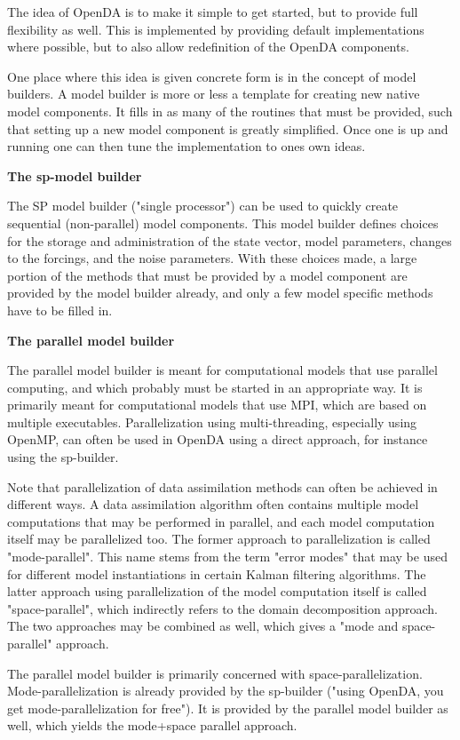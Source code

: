 The idea of OpenDA is to make it simple to get started, but to provide full flexibility as well. This is implemented by providing default implementations where possible, but to also allow redefinition of the OpenDA components.

One place where this idea is given concrete form is in the concept of model builders. A model builder is more or less a template for creating new native model components. It fills in as many of the routines that must be provided, such that setting up a new model component is greatly simplified. Once one is up and running one can then tune the implementation to ones own ideas.

\textbf{The sp-model builder}

The SP model builder ("single processor") can be used to quickly create sequential (non-parallel) model components. This model builder defines choices for the storage and administration of the state vector, model parameters, changes to the forcings, and the noise parameters. With these choices made, a large portion of the methods that must be provided by a model component are provided by the model builder already, and only a few model specific methods have to be filled in.

\textbf{The parallel model builder}

The parallel model builder is meant for computational models that use parallel computing, and which probably must be started in an appropriate way. It is primarily meant for computational models that use MPI, which are based on multiple executables. Parallelization using multi-threading, especially using OpenMP, can often be used in OpenDA using a direct approach, for instance using the sp-builder.

Note that parallelization of data assimilation methods can often be achieved in different ways. A data assimilation algorithm often contains multiple model computations that may be performed in parallel, and each model computation itself may be parallelized too. The former approach to parallelization is called "mode-parallel". This name stems from the term "error modes" that may be used for different model instantiations in certain Kalman filtering algorithms. The latter approach using parallelization of the model computation itself is called "space-parallel", which indirectly refers to the domain decomposition approach. The two approaches may be combined as well, which gives a "mode and space-parallel" approach.

The parallel model builder is primarily concerned with space-parallelization. Mode-parallelization is already provided by the sp-builder ("using OpenDA, you get mode-parallelization for free"). It is provided by the parallel model builder as well, which yields the mode+space parallel approach.

